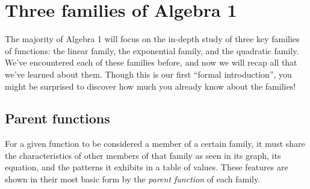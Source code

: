 
\section{Three families of Algebra 1}
\label{sec:threefamilies}


The majority of Algebra 1 will focus on the in-depth study of three key families of functions: the linear family, the exponential family, and the quadratic family. We've encountered each of these families before, and now we will recap all that we've learned about them. Though this is our first ``formal introduction'', you might be surprised to discover how much you already know about the families!

\begin{boxedexplore}
\end{boxedexplore}

\subsection{Parent functions}

For a given function to be considered a member of a certain family, it must share the characteristics of other members of that family as seen in its graph, its equation, and the patterns it exhibits in a table of values. These features are shown in their most basic form by the \textit{parent function} of each family.

